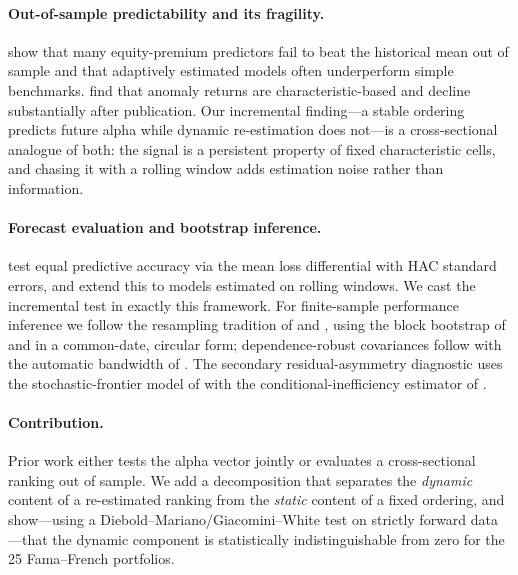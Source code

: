\documentclass[11pt]{article}
\begin{document}
\paragraph{Out-of-sample predictability and its fragility.}
\citet{WelchGoyal2008} show that many equity-premium predictors fail to beat
the historical mean out of sample and that adaptively estimated models often
underperform simple benchmarks. \citet{McLeanPontiff2016} find that anomaly
returns are characteristic-based and decline substantially after publication.
Our incremental finding---a stable ordering predicts future alpha while
dynamic re-estimation does not---is a cross-sectional analogue of both: the
signal is a persistent property of fixed characteristic cells, and chasing it
with a rolling window adds estimation noise rather than information.

\paragraph{Forecast evaluation and bootstrap inference.}
\citet{DieboldMariano1995} test equal predictive accuracy via the mean loss
differential with HAC standard errors, and \citet{GiacominiWhite2006} extend
this to models estimated on rolling windows. We cast the incremental test in
exactly this framework. For finite-sample performance inference we follow the
resampling tradition of \citet{KosowskiTimmermannWermersWhite2006} and
\citet{FamaFrench2010}, using the block bootstrap of \citet{Kunsch1989} and
\citet{PolitisRomano1994} in a common-date, circular form; dependence-robust
covariances follow \citet{NeweyWest1987} with the automatic bandwidth of
\citet{NeweyWest1994}. The secondary residual-asymmetry diagnostic uses the
stochastic-frontier model of \citet{AignerLovellSchmidt1977} with the
conditional-inefficiency estimator of \citet{JondrowLovellMaterovSchmidt1982}.

\paragraph{Contribution.}
Prior work either tests the alpha vector jointly \citep{GRS1989} or evaluates a
cross-sectional ranking out of sample. We add a decomposition that separates
the \emph{dynamic} content of a re-estimated ranking from the \emph{static}
content of a fixed ordering, and show---using a Diebold--Mariano/Giacomini--White
test on strictly forward data---that the dynamic component is statistically
indistinguishable from zero for the 25 Fama--French portfolios.
\end{document}
